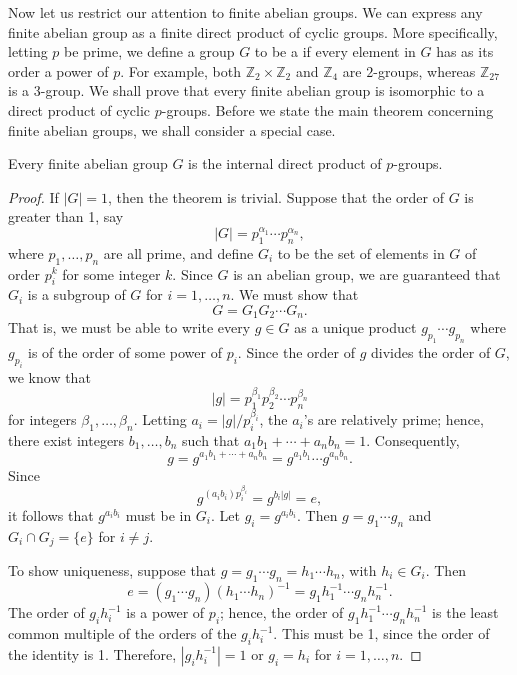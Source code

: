 \medskip
 
Now let us restrict our attention to finite abelian groups. We can
express any finite abelian group as a finite direct product of cyclic
groups. More specifically, letting $p$ be prime, we define a group $G$
to be a  if every element in 
$G$ has as its order a power of $p$. For example, both ${\mathbb Z}_2 
\times {\mathbb Z}_2$ and ${\mathbb Z}_4$ are $2$-groups, whereas 
${\mathbb Z}_{27}$ is a $3$-group. We shall prove that every finite 
abelian group is isomorphic to a direct product of cyclic $p$-groups. 
Before we  state the main theorem concerning finite abelian groups, we 
shall consider a special case.
 
 
\begin{theorem}
Every finite abelian group $G$ is the internal direct product of $p$-groups. 
\end{theorem}


 
\begin{proof}
If $|G|= 1$, then the theorem is trivial.  Suppose that the order of
$G$ is greater than 1, say 
\[
|G| = p_1^{\alpha_1} \cdots p_n^{\alpha_n},
\]
where $p_1, \ldots, p_n$ are all prime, and define $G_i$ to be the set
of elements in $G$ of order $p_i^k$ for some integer $k$. Since $G$ is
an abelian group, we are guaranteed that $G_i$ is a subgroup of $G$
for $i = 1, \ldots, n$. We must show that
\[
G = G_1 G_2 \cdots  G_n.
\]
That is, we must be able to write every $g \in G$ as a unique product
$g_{p_1} \cdots g_{p_n}$ where $g_{p_i}$ is of the order of some power
of $p_i$. Since the order of $g$ divides the order of $G$, we know
that 
\[
|g| = p_1^{\beta_1}  p_2^{\beta_2} \cdots p_n^{\beta_n}
\]
for integers $\beta_1, \ldots, \beta_n$. Letting $a_i = |g| /
p_i^{\beta_i}$, the $a_i$'s are relatively prime; hence, there exist
integers $b_1, \ldots, b_n$ such that $a_1 b_1 + \cdots + a_n b_n =
1$. Consequently, 
\[
g = g^{a_1 b_1 + \cdots + a_n b_n} = g^{a_1 b_1} \cdots  g^{a_n b_n}. 
\]
Since
\[
g^{(a_i b_i ) p_i^{\beta_i}} = g^{b_i |g|} = e,
\]
it follows that $g^{a_i b_i}$ must be in $G_{i}$. Let $g_i =
g^{a_i b_i}$. Then $g = g_1 \cdots g_n$ and $G_i \cap G_j = \{ e \}$ for $i
\neq j$. 
 
 
To show uniqueness, suppose that $g = g_1 \cdots g_n = h_1 \cdots h_n$,
with $h_i \in G_i$. Then
\[
e = (g_1 \cdots g_n)(h_1 \cdots h_n)^{-1} = g_1 h_1^{-1} \cdots g_n
h_n^{-1}. 
\]
The order of $g_i h_i^{-1}$ is a power of $p_i$; hence, the order of
$g_1 h_1^{-1} \cdots g_n h_n^{-1}$ is the least common multiple of the
orders of the $g_i h_i^{-1}$.  This must be 1, since the order of the
identity is 1. Therefore, $|g_i h_i^{-1}| =1$ or $g_i =h_i$ for $i =
1, \ldots, n$.
\mbox{\hspace{1in}}
\end{proof}
 
